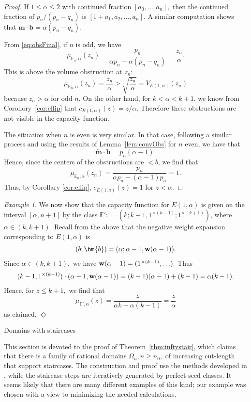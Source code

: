 \documentclass[11pt, reqno]{amsart}
\makeatletter
\def\section{\@startsection{section}{1}%
  \z@{.7\linespacing\@plus\linespacing}{.5\linespacing}%
  {\normalfont\Large\bfseries}}
\theoremstyle{remark}
\numberwithin{equation}{subsection}
\numberwithin{figure}{section}
\theoremstyle{customremark}
\newtheorem{example_no_diamond}[thm]{Example}
\newenvironment{example}{\begin{example_no_diamond} } {\hfill$\er$ \end{example_no_diamond}}
\newcommand{\bw}{{\bf w}}
\newcommand{\bE}{{\mathbb E}}
\newcommand{\al}{{\alpha}}
\newcommand{\Om}{{\Omega}}
\newcommand{\er}{{\Diamond}}
\newcommand{\btm}{\widetilde{\bm{m}}}
\makeatother
\begin{document}
\begin{proof}
    
    If $1 \leq \al \leq 2$ with continued fraction $[a_0,\hdots,a_n],$ then the continued fraction of $p_n/(p_n-q_n)$ is $[1+a_1,a_2,\hdots,a_n]$. A similar computation shows that $\btm \cdot \bm{b}=\al(p_n-q_n).$
    

From \eqref{eq:obsFinal}, if $n$ is odd, we have
\begin{equation} \label{eq:obsEn}
     \mu_{\bE_n,\al}(z_{n})=\frac{p_{n}}{\al p_{n}-\al(p_{n}-q_{n})}=\frac{z_{n}}{\al}. 
\end{equation}
This is above the volume obstruction at $z_n:$
\[\mu_{\bE_n,\al}(z_{n})=\frac{z_{n}}{\al }>\sqrt{\frac{z_{n}}{ \al}}=  V_{E(1,\al)}(z_{n})\]
because  $z_{n}>\al$ for odd $n$. On the other hand, for $k<\al< k+1$. we know from Corollory~\ref{cor:ellip}
that  $c_{E(1,\al)}(z) = z/\al $.  Therefore these obstructions are not visible in the capacity function.

The situation when $n$ is even is very similar. In that case, following a similar process and using the results of Lemma~\ref{lem:convObs} for $n$ even, we have that 
\[ \btm \cdot \bm{b}=p_n(\al-1).\]
Hence, since  the centers of the obstructions are $< b$, we find that
\[ \mu_{\bE_n,\al}(z_n)=\frac{p_n}{\al p_n-(\al-1)p_n}=1.\] 
Thus, by Corollary \ref{cor:ellip}, $c_{E(1,a)}(z)=1$ for $z<\al$. 
\end{proof}


\begin{example}\label{ex:E'}  \rm We now show that the capacity function for $E(1,\al)$ is given on the interval $[\al, n+1]$ by the class
 $\bE': = (k; k-1, 1^{\times (k-1)}; 1^{\times (k+1)})$, where  $\al \in (k,k+1).$   Recall from the above that the negative weight expansion corresponding to $E(1,\al)$ is
    \[ (b;\bm{b})=(\al;\al-1,\bw(\al-1)).\]
  Since $\al \in (k,k+1),$ we have $\bw(\al-1)=(1^{\times (k-1)},\hdots).$  Thus
    \[ (k-1,1^{\times (k-1)}) \cdot (\al-1,\bw(\al-1))=(k-1)(\al-1)+(k-1)=\al(k-1).\]
    Hence, for $z \leq k+1,$ we find that
    \[\mu_{\bE',\al}(z)=\frac{z}{\al k-\al(k-1)}=\frac{z}{\al}\]
as claimed.
\end{example}



\section{Domains with staircases}\label{sec:stair}

This section is devoted to the proof of Theorem~\ref{thm:inftystair}, which claims that there is a family of rational domains $\Om_n, n\ge n_0,$ of increasing cut-length that support staircases. The construction and proof use the methods developed in \cite{BHM,MM,MMW}, while the staircase steps are iteratively generated by perfect seed classes.  It seems likely that there are many different examples of this kind; our example was chosen with a view to minimizing the needed calculations.
\end{document}
